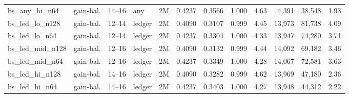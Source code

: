 \documentclass[11pt]{article}
\begin{document}
\begin{center}
\begin{tabular}{llllrrrrrrrr}
bs\_any\_hi\_n64 & gain-bal. & 14--16 & any & 2M & 0.4237 & 0.3566 & 1.000 & 4.63 & 4{,}391 & 38{,}548 & 1.93\\
bs\_led\_lo\_n128 & gain-bal. & 12--14 & ledger & 2M & 0.4090 & 0.3107 & 0.999 & 4.45 & 13{,}973 & 81{,}738 & 4.09\\
bs\_led\_lo\_n64 & gain-bal. & 12--14 & ledger & 2M & 0.4237 & 0.3304 & 1.000 & 4.33 & 13{,}947 & 74{,}280 & 3.71\\
bs\_led\_mid\_n128 & gain-bal. & 12--16 & ledger & 2M & 0.4090 & 0.3132 & 0.999 & 4.44 & 14{,}092 & 69{,}182 & 3.46\\
bs\_led\_mid\_n64 & gain-bal. & 12--16 & ledger & 2M & 0.4237 & 0.3349 & 1.000 & 4.28 & 14{,}067 & 72{,}581 & 3.63\\
bs\_led\_hi\_n128 & gain-bal. & 14--16 & ledger & 2M & 0.4090 & 0.3282 & 0.999 & 4.62 & 13{,}969 & 47{,}180 & 2.36\\
bs\_led\_hi\_n64 & gain-bal. & 14--16 & ledger & 2M & 0.4237 & 0.3403 & 1.000 & 4.27 & 13{,}948 & 44{,}312 & 2.22\\
\bottomrule
\end{tabular}
\end{center}
\end{document}
